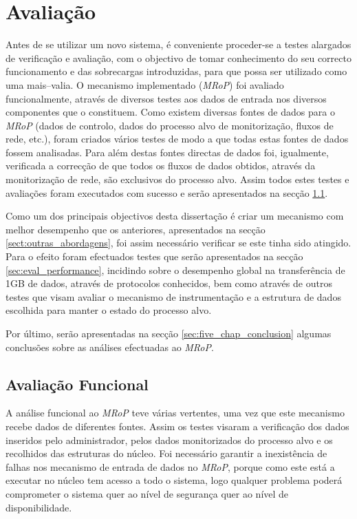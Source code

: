 \chapter{Avaliação}
\label{cap:avaliacao}

Antes de se utilizar um novo sistema, é conveniente proceder-se a testes alargados de verificação e avaliação, com o objectivo de tomar conhecimento do seu correcto funcionamento e das sobrecargas introduzidas, para que possa ser utilizado como uma mais–valia.
O mecanismo implementado (\textit{MRoP}) foi avaliado funcionalmente, através de diversos testes aos dados de entrada nos diversos componentes que o constituem.
Como existem diversas fontes de dados para o \textit{MRoP} (dados de controlo, dados do processo alvo de monitorização, fluxos de rede, etc.), foram criados vários testes de modo a que todas estas fontes de dados fossem analisadas.
Para além destas fontes directas de dados foi, igualmente, verificada a correcção de que todos os fluxos de dados obtidos, através da monitorização de rede, são exclusivos do processo alvo.
Assim todos estes testes e avaliações foram executados com sucesso e serão apresentados na secção \ref{sec:eval_functional}.

Como um dos principais objectivos desta dissertação é criar um mecanismo com melhor desempenho que os anteriores, apresentados na secção \ref{sect:outras_abordagens}, foi assim necessário verificar se este tinha sido atingido.
Para o efeito foram efectuados testes que serão apresentados na secção \ref{sec:eval_performance}, incidindo sobre o desempenho global na transferência de 1GB de dados, através de protocolos conhecidos, bem como através de outros testes que visam avaliar o mecanismo de instrumentação e a estrutura de dados escolhida para manter o estado do processo alvo.

Por último, serão apresentadas na secção \ref{sec:five_chap_conclusion} algumas conclusões sobre as análises efectuadas ao \textit{MRoP}.

\section{Avaliação Funcional}
\label{sec:eval_functional}

A análise funcional ao \textit{MRoP} teve várias vertentes, uma vez que este mecanismo recebe dados de diferentes fontes.
Assim os testes visaram a verificação dos dados inseridos pelo administrador, pelos dados monitorizados do processo alvo e os recolhidos das estruturas do núcleo.
Foi necessário garantir a inexistência de falhas nos mecanismo de entrada de dados no \textit{MRoP}, porque como este está a executar no núcleo tem acesso a todo o sistema, logo qualquer problema poderá comprometer o sistema quer ao nível de segurança quer ao nível de disponibilidade.



